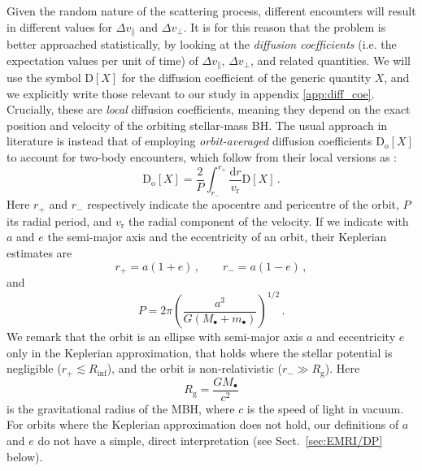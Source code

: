 \documentclass[desactivate]{aa}
\begin{document}
        Given the random nature of the scattering process, different encounters will result in different values for $\Delta v_\parallel$ and $\Delta v_\perp$. It is for this reason that the problem is better approached statistically, by looking at the \textit{diffusion coefficients} (i.e. the expectation values per unit of time) of $\Delta v_\parallel$, $\Delta v_\perp$, and related quantities. We will use the symbol $\mathrm{D}[X]$ for the diffusion coefficient of the generic quantity $X$, and we explicitly write those relevant to our study in appendix \ref{app:diff_coe}. Crucially, these are \textit{local} diffusion coefficients, meaning they depend on the exact position and velocity of the orbiting stellar-mass BH. The usual approach in literature is instead that of employing \textit{orbit-averaged} diffusion coefficients $\mathrm{D_o}[X]$ to account for two-body encounters, which follow from their local versions as \citep{2008gady.book.....B,2013degn.book.....M}:
        \begin{equation}
            \mathrm{D_o}[X] = \frac{2}{P} \int^{r_+}_{r_-} \frac{\mathrm{d}r}{v_\mathrm{r}} \mathrm{D}[X] \, .
        \end{equation}
        Here $r_+$ and $r_-$ respectively indicate the apocentre and pericentre of the orbit, $P$ its radial period, and $v_\mathrm{r}$ the radial component of the velocity. If we indicate with $a$ and $e$ the semi-major axis and the eccentricity of an orbit, their Keplerian estimates are
        \begin{equation} \label{eq:peri_apo}
            r_+ = a(1+e) \, , \qquad r_- = a(1-e) \, ,
        \end{equation}
        and
        \begin{equation} \label{eq:period}
            P = 2 \pi \left(\frac{a^3}{G (M_\bullet + m_\bullet)} \right)^{1/2} \, .
        \end{equation}
        We remark that the orbit is an ellipse with semi-major axis $a$ and eccentricity $e$ only in the Keplerian approximation, that holds where the stellar potential is negligible ($r_+ \lesssim R_\mathrm{inf}$), and the orbit is non-relativistic ($r_-\gg R_\mathrm{g}$). Here
        \begin{equation}
            R_\mathrm{g} = \frac{GM_\bullet}{c^2}
        \end{equation}
        is the gravitational radius of the MBH, where $c$ is the speed of light in vacuum. For orbits where the Keplerian approximation does not hold, our definitions of $a$ and $e$ do not have a simple, direct interpretation (see Sect.\ \ref{sec:EMRI/DP} below).
        
\end{document}

